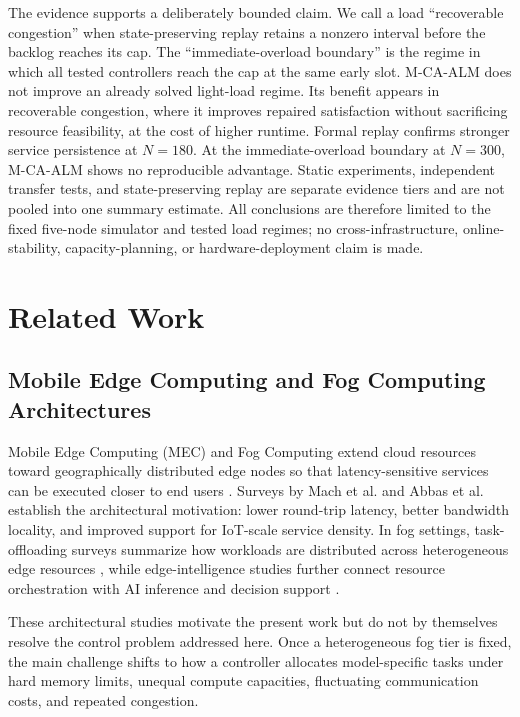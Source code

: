 \documentclass[pdflatex,sn-mathphys-num]{sn-jnl}
\begin{document}
The evidence supports a deliberately bounded claim. We call a load ``recoverable congestion'' when state-preserving replay retains a nonzero interval before the backlog reaches its cap. The ``immediate-overload boundary'' is the regime in which all tested controllers reach the cap at the same early slot. M-CA-ALM does not improve an already solved light-load regime. Its benefit appears in recoverable congestion, where it improves repaired satisfaction without sacrificing resource feasibility, at the cost of higher runtime. Formal replay confirms stronger service persistence at $N=180$. At the immediate-overload boundary at $N=300$, M-CA-ALM shows no reproducible advantage. Static experiments, independent transfer tests, and state-preserving replay are separate evidence tiers and are not pooled into one summary estimate. All conclusions are therefore limited to the fixed five-node simulator and tested load regimes; no cross-infrastructure, online-stability, capacity-planning, or hardware-deployment claim is made.



\section{Related Work}

\subsection{Mobile Edge Computing and Fog Computing Architectures}
Mobile Edge Computing (MEC) and Fog Computing extend cloud resources toward geographically distributed edge nodes so that latency-sensitive services can be executed closer to end users \cite{Mao2017, Shi2016}. Surveys by Mach et al. \cite{Mach2017} and Abbas et al. \cite{Abbas2018} establish the architectural motivation: lower round-trip latency, better bandwidth locality, and improved support for IoT-scale service density. In fog settings, task-offloading surveys summarize how workloads are distributed across heterogeneous edge resources \cite{Kumari2022}, while edge-intelligence studies further connect resource orchestration with AI inference and decision support \cite{Zhou2019}.

These architectural studies motivate the present work but do not by themselves resolve the control problem addressed here. Once a heterogeneous fog tier is fixed, the main challenge shifts to how a controller allocates model-specific tasks under hard memory limits, unequal compute capacities, fluctuating communication costs, and repeated congestion.
\end{document}
